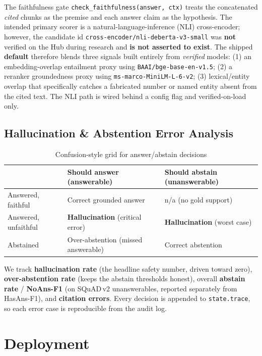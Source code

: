 \documentclass[12pt,a4paper]{article}
\begin{document}
The faithfulness gate \texttt{check\_faithfulness(answer, ctx)} treats the concatenated \emph{cited} chunks as the premise and each answer claim as the hypothesis. The intended primary scorer is a natural-language-inference (NLI) cross-encoder; however, the candidate id \texttt{cross-encoder/nli-deberta-v3-small} was \textbf{not} verified on the Hub during research and \textbf{is not asserted to exist}. The shipped \textbf{default} therefore blends three signals built entirely from \emph{verified} models: (1) an embedding-overlap entailment proxy using \texttt{BAAI/bge-base-en-v1.5}; (2) a reranker groundedness proxy using \texttt{ms-marco-MiniLM-L-6-v2}; (3) lexical/entity overlap that specifically catches a fabricated number or named entity absent from the cited text. The NLI path is wired behind a config flag and verified-on-load only.

\subsection{Hallucination \& Abstention Error Analysis}

\begin{table}[H]
\centering
\caption{Confusion-style grid for answer/abstain decisions}
\small
\begin{tabularx}{\linewidth}{@{} l L L @{}}
\toprule
 & \textbf{Should answer (answerable)} & \textbf{Should abstain (unanswerable)} \\
\midrule
Answered, faithful & Correct grounded answer & n/a (no gold support) \\
Answered, unfaithful & \textbf{Hallucination} (critical error) & \textbf{Hallucination} (worst case) \\
Abstained & Over-abstention (missed answerable) & Correct abstention \\
\bottomrule
\end{tabularx}
\end{table}

\noindent We track \textbf{hallucination rate} (the headline safety number, driven toward zero), \textbf{over-abstention rate} (keeps the abstain thresholds honest), overall \textbf{abstain rate} / \textbf{NoAns-F1} (on SQuAD\,v2 unanswerables, reported separately from HasAns-F1), and \textbf{citation errors}. Every decision is appended to \texttt{state.trace}, so each error case is reproducible from the audit log.

\section{Deployment}
\end{document}
